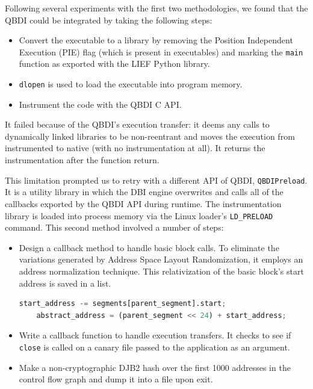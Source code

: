 \documentclass[../main.tex]{subfiles}
\begin{document}
Following several experiments with the first two methodologies, we found that
the QBDI could be integrated by taking the following steps:

\begin{itemize}
  \tightlist
  \item
        Convert the executable to a library by removing the Position Independent Execution (PIE) flag (which is
        present in executables) and marking the \texttt{main} function as
        exported with the LIEF Python library.
  \item
        \texttt{dlopen} is used to load the executable into program memory.
  \item
        Instrument the code with the QBDI C API.
\end{itemize}

It failed because of the QBDI's execution transfer: it deems any calls to
dynamically linked libraries to be non-reentrant and moves the execution from
instrumented to native (with no instrumentation at all). It returns the
instrumentation after the function return.

This limitation prompted us to retry with a different API of QBDI,
\texttt{QBDIPreload}. It is a utility library in which the DBI engine
overwrites and calls all of the callbacks exported by the QBDI API during
runtime. The instrumentation library is loaded into process memory via the
Linux loader's \texttt{LD\_PRELOAD} command. This second method involved a
number of steps:

\begin{itemize}
  \item
        Design a callback method to handle basic block calls. To eliminate the
        variations generated by Address Space Layout Randomization, it employs
        an address normalization technique. This relativization of the basic
        block's start address is saved in a list.

        \begin{lstlisting}[captionpos=b,language=Python, caption=Address Normalization Technique]
    start_address -= segments[parent_segment].start;
    abstract_address = (parent_segment << 24) + start_address;
\end{lstlisting}

  \item
        Write a callback function to handle execution transfers. It checks to
        see if \texttt{close} is called on a canary file passed to the
        application as an argument.
  \item
        Make a non-cryptographic DJB2 hash over the first 1000 addresses in
        the control flow graph and dump it into a file upon exit.
\end{itemize}
\end{document}

